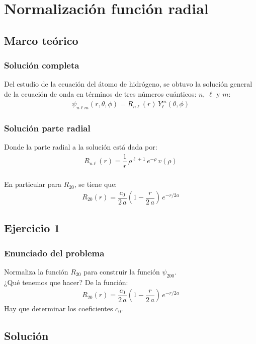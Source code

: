 \documentclass[12pt]{beamer}
\begin{document}
\section{Normalización función radial}
\subsection{Marco teórico}

\begin{frame}
\frametitle{Solución completa}
Del estudio de la ecuación del átomo de hidrógeno, se obtuvo la solución general de la ecuación de onda en términos de tres números cuánticos: $n$, $\ell$ y $m$:
\pause
\begin{align*}
\psi_{n \ell m} (r, \theta, \phi) =  R_{n \ell} (r) \, Y_{\ell}^{m} (\theta, \phi)
\end{align*}
\end{frame}
\begin{frame}
\frametitle{Solución parte radial}
Donde la parte radial a la solución está dada por:
\pause
\begin{align*}
R_{n \ell}(r) = \dfrac{1}{r} \, \rho^{\ell + 1} \, e^{-\rho} \, v(\rho)
\end{align*}
\\
\bigskip
\pause
En particular para $R_{20}$, se tiene que:
\pause
\begin{align*}
R_{20}(r) = \dfrac{c_{0}}{2 \, a} \left( 1 - \dfrac{r}{2 \, a} \right) \, e^{-r/2a}
\end{align*}
\end{frame}

\subsection{Ejercicio 1}

\begin{frame}
\frametitle{Enunciado del problema}
Normaliza la función $R_{20}$ para construir la función $\psi_{200}$.
\\
\bigskip
\pause
¿Qué tenemos que hacer? \pause
De la función:
\pause
\begin{align*}
R_{20}(r) = \dfrac{c_{0}}{2 \, a} \left( 1 - \dfrac{r}{2 \, a} \right) \, e^{-r/2a}
\end{align*}
Hay que determinar los coeficientes $c_{0}$.
\end{frame}

\subsection*{Solución}
\end{document}
